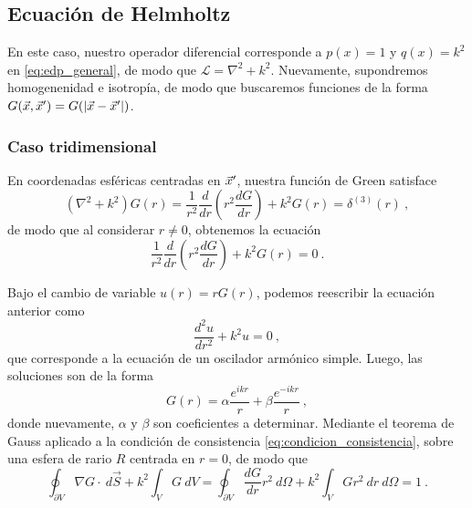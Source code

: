 \subsection{Ecuación de Helmholtz}

En este caso, nuestro operador diferencial corresponde a $p(x) = 1$ y $q(x) = k^2$ en \eqref{eq:edp_general}, de modo que $\mathcal{L} = \nabla^2 + k^2$. Nuevamente, supondremos homogenenidad e isotropía, de modo que buscaremos funciones de la forma $G(\vec{x}, \vec{x}') = G(|\vec{x} - \vec{x}'|)$.

\subsubsection{Caso tridimensional}

En coordenadas esféricas centradas en $\vec{x}'$, nuestra función de Green satisface
\begin{equation}
    (\nabla^2 + k^2) G(r) = \frac{1}{r^2} \frac{d}{dr}\left( r^2 \frac{dG}{dr} \right) + k^2 G(r) = \delta^{(3)}(r) \ ,
\end{equation}
de modo que al considerar $r \neq 0$, obtenemos la ecuación
\begin{equation}
    \frac{1}{r^2} \frac{d}{dr}\left( r^2 \frac{dG}{dr} \right) + k^2 G(r) = 0 \ .
\end{equation}

Bajo el cambio de variable $u(r) = r G(r)$, podemos reescribir la ecuación anterior como
\begin{equation}
    \frac{d^2 u}{dr^2} + k^2 u = 0 \ ,
\end{equation}
que corresponde a la ecuación de un oscilador armónico simple. Luego, las soluciones son de la forma
\begin{equation}\label{eq:solucion_green_Helmholtz}
    G(r) = \alpha \frac{e^{ikr}}{r} + \beta \frac{e^{-ikr}}{r} \ ,
\end{equation}
donde nuevamente, $\alpha$ y $\beta$ son coeficientes a determinar. Mediante el teorema de Gauss aplicado a la condición de consistencia \eqref{eq:condicion_consistencia}, sobre una esfera de rario $R$ centrada en $r=0$, de modo que
\begin{equation}
    \oint_{\partial V}  \nabla G \cdot \ d\vec{S} + k^2 \int_V G \ dV = \oint_{\partial V} \frac{dG}{dr} r^2 \ d\Omega + k^2 \int_V G r^2 \ dr \ d\Omega = 1 \ .
\end{equation}

